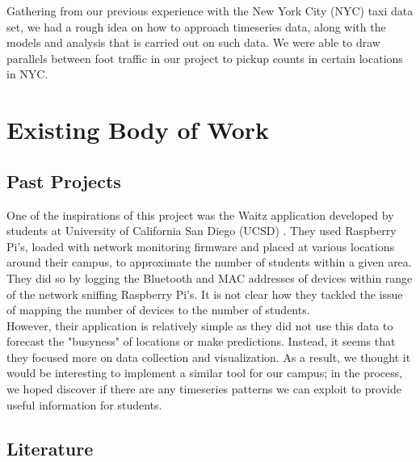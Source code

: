 \documentclass[journal, 12pt]{IEEEtran}
\begin{document}
\noindent Gathering from our previous experience with the New York City (NYC) taxi data set, we had a rough idea on how to approach timeseries data, along with the models and analysis that is carried out on such data. We were able to draw parallels between foot traffic in our project to pickup counts in certain locations in NYC.


\section{Existing Body of Work}

\subsection{Past Projects}

\noindent One of the inspirations of this project was the Waitz application developed by students at University of California San Diego (UCSD) \cite{waitz}. They used Raspberry Pi's, loaded with network monitoring firmware and placed at various locations around their campus, to approximate the number of students within a given area. They did so by logging the Bluetooth and MAC addresses of devices within range of the network sniffing Raspberry Pi's. It is not clear how they tackled the issue of mapping the number of devices to the number of students.\\


\noindent However, their application is relatively simple as they did not use this data to forecast the "busyness" of locations or make predictions. Instead, it seems that they focused more on data collection and visualization. As a result, we thought it would be interesting to implement a similar tool for our campus; in the process, we hoped discover if there are any timeseries patterns we can exploit to provide useful information for students.

\subsection{Literature}
\end{document}

